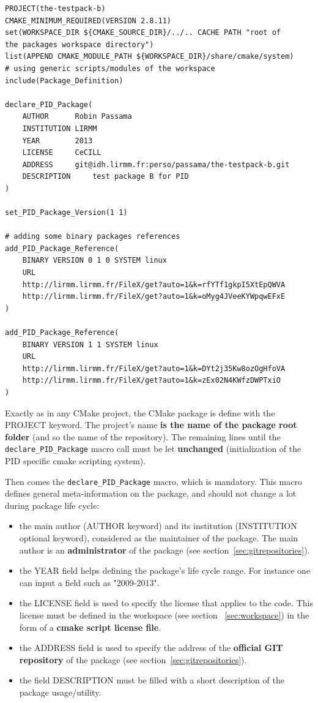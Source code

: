 \documentclass[12pt,a4paper]{article}
\begin{document}
\begin{verbatim}
PROJECT(the-testpack-b)
CMAKE_MINIMUM_REQUIRED(VERSION 2.8.11)
set(WORKSPACE_DIR ${CMAKE_SOURCE_DIR}/../.. CACHE PATH "root of 
the packages workspace directory")
list(APPEND CMAKE_MODULE_PATH ${WORKSPACE_DIR}/share/cmake/system) 
# using generic scripts/modules of the workspace
include(Package_Definition)

declare_PID_Package(	
    AUTHOR      Robin Passama 
    INSTITUTION LIRMM 
    YEAR        2013 
    LICENSE     CeCILL
    ADDRESS     git@idh.lirmm.fr:perso/passama/the-testpack-b.git
    DESCRIPTION 	test package B for PID
)

set_PID_Package_Version(1 1)

# adding some binary packages references
add_PID_Package_Reference(
    BINARY VERSION 0 1 0 SYSTEM linux 
    URL 	
    http://lirmm.lirmm.fr/FileX/get?auto=1&k=rfYTf1gkpI5XtEpQWVA		
    http://lirmm.lirmm.fr/FileX/get?auto=1&k=oMyg4JVeeKYWpqwEFxE
)

add_PID_Package_Reference(	
    BINARY VERSION 1 1 SYSTEM linux 
    URL 
    http://lirmm.lirmm.fr/FileX/get?auto=1&k=DYt2j35Kw8ozOgHfoVA
    http://lirmm.lirmm.fr/FileX/get?auto=1&k=zEx02N4KWfzDWPTxiO
)
\end{verbatim}

Exactly as in any CMake project, the CMake package is define with the PROJECT keyword. The project's name \textbf{is the name of the package root folder} (and so the name of the repository). The remaining lines until the \texttt{declare\_PID\_Package} macro call must be let \textbf{unchanged} (initialization of the PID specific cmake scripting system).

Then comes the \texttt{declare\_PID\_Package} macro, which is mandatory. This macro defines general meta-information on the package, and should not change a lot during package life cycle: 
\begin{itemize}
\item the main author (AUTHOR keyword) and its institution (INSTITUTION optional keyword), considered as the maintainer of the package. The main author is an \textbf{administrator} of the package (see section~\ref{sec:gitrepositories}).
\item the YEAR field helps defining the package's life cycle range. For instance one can input a field such as "2009-2013".
\item the LICENSE field is used to specify the license that applies to the code. This license must be defined in the workspace (see section ~\ref{sec:workspace}) in the form of a \textbf{cmake script license file}.
\item the ADDRESS field is used to specify the address of the \textbf{official GIT repository} of the package (see section~\ref{sec:gitrepositories}).
\item the field DESCRIPTION must be filled with a short description of the package usage/utility.
\end{itemize}
~\\
\end{document}

